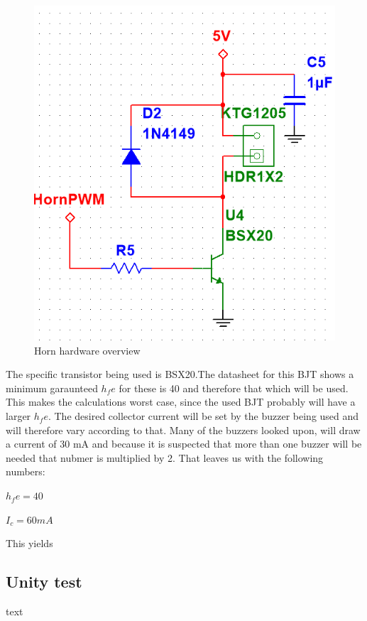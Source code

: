 \begin{figure}[H]
	\centering
	\includegraphics[width=0.7\linewidth]{Hardware/Pictures/Horn_hw}
	\caption{Horn hardware overview}
	\label{fig:Horn control}
\end{figure}

The specific transistor being used is BSX20.The datasheet  for this BJT shows a minimum garaunteed $h_fe$ for these is 40 and therefore that which will be used. This makes the calculations worst case, since the used BJT probably will have a larger $h_fe$. The desired collector current will be set by the buzzer being used and will therefore vary according to that. Many of the buzzers looked upon, will draw a current of 30 mA and because it is suspected that more than one buzzer will be needed that nubmer is multiplied by 2. That leaves us with the following numbers:

$h_fe = 40 $ 

$I_c = 60 mA$

This yields 
\subsection{Unity test}
text